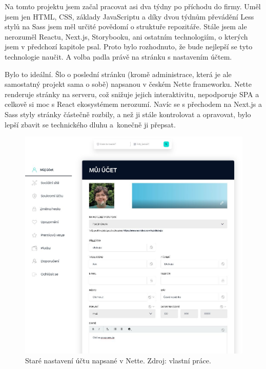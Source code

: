 Na tomto projektu jsem začal pracovat asi dva týdny po příchodu do firmy. Uměl jsem jen HTML, CSS, základy JavaScriptu a díky dvou týdnům převádění Less stylů na Sass jsem měl určité povědomí o struktuře repozitáře. Stále jsem ale nerozuměl Reactu, Next.js, Storybooku, ani ostatním technologiím, o kterých jsem v předchozí kapitole psal. Proto bylo rozhodnuto, že bude nejlepší se tyto technologie naučit. A volba padla právě na stránku s nastavením účtem.

Bylo to ideální. Šlo o poslední stránku (kromě administrace, která je ale samostatný projekt sama o sobě) napsanou v českém Nette frameworku. Nette renderuje stránky na serveru, což snižuje jejich interaktivitu, nepodporuje SPA a celkově si moc s React ekosystémem nerozumí\cite{NetteHowAppsWork}. Navíc se s přechodem na Next.js a Sass styly stránky částečně rozbily, a než ji stále kontrolovat a opravovat, bylo lepší zbavit se technického dluhu a~konečně ji přepsat.

\begin{figure}[!h]
    \centering
    \includegraphics[width=0.7\linewidth]{obrazky/settings_old.png}
    \caption{Staré nastavení účtu napsané v Nette. Zdroj: vlastní práce.}
\end{figure}